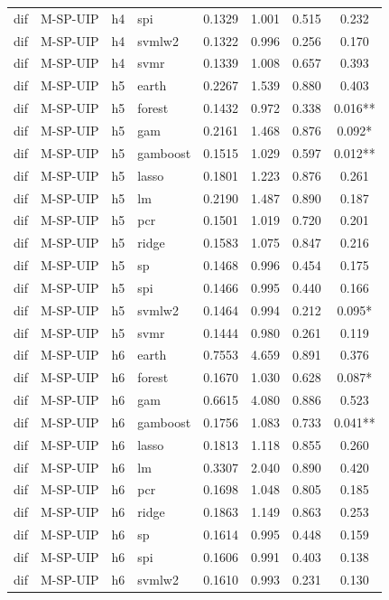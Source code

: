 \begin{ThreePartTable}
\begin{longtable}[t]{llclcccc}
dif & M-SP-UIP & h4 & spi & 0.1329 & 1.001 & 0.515 & 0.232\\
dif & M-SP-UIP & h4 & svmlw2 & 0.1322 & 0.996 & 0.256 & 0.170\\
dif & M-SP-UIP & h4 & svmr & 0.1339 & 1.008 & 0.657 & 0.393\\
\addlinespace
dif & M-SP-UIP & h5 & earth & 0.2267 & 1.539 & 0.880 & 0.403\\
dif & M-SP-UIP & h5 & forest & 0.1432 & 0.972 & 0.338 & 0.016**\\
dif & M-SP-UIP & h5 & gam & 0.2161 & 1.468 & 0.876 & 0.092*\\
dif & M-SP-UIP & h5 & gamboost & 0.1515 & 1.029 & 0.597 & 0.012**\\
dif & M-SP-UIP & h5 & lasso & 0.1801 & 1.223 & 0.876 & 0.261\\
dif & M-SP-UIP & h5 & lm & 0.2190 & 1.487 & 0.890 & 0.187\\
dif & M-SP-UIP & h5 & pcr & 0.1501 & 1.019 & 0.720 & 0.201\\
dif & M-SP-UIP & h5 & ridge & 0.1583 & 1.075 & 0.847 & 0.216\\
dif & M-SP-UIP & h5 & sp & 0.1468 & 0.996 & 0.454 & 0.175\\
dif & M-SP-UIP & h5 & spi & 0.1466 & 0.995 & 0.440 & 0.166\\
dif & M-SP-UIP & h5 & svmlw2 & 0.1464 & 0.994 & 0.212 & 0.095*\\
dif & M-SP-UIP & h5 & svmr & 0.1444 & 0.980 & 0.261 & 0.119\\
\addlinespace
dif & M-SP-UIP & h6 & earth & 0.7553 & 4.659 & 0.891 & 0.376\\
dif & M-SP-UIP & h6 & forest & 0.1670 & 1.030 & 0.628 & 0.087*\\
dif & M-SP-UIP & h6 & gam & 0.6615 & 4.080 & 0.886 & 0.523\\
dif & M-SP-UIP & h6 & gamboost & 0.1756 & 1.083 & 0.733 & 0.041**\\
dif & M-SP-UIP & h6 & lasso & 0.1813 & 1.118 & 0.855 & 0.260\\
dif & M-SP-UIP & h6 & lm & 0.3307 & 2.040 & 0.890 & 0.420\\
dif & M-SP-UIP & h6 & pcr & 0.1698 & 1.048 & 0.805 & 0.185\\
dif & M-SP-UIP & h6 & ridge & 0.1863 & 1.149 & 0.863 & 0.253\\
dif & M-SP-UIP & h6 & sp & 0.1614 & 0.995 & 0.448 & 0.159\\
dif & M-SP-UIP & h6 & spi & 0.1606 & 0.991 & 0.403 & 0.138\\
dif & M-SP-UIP & h6 & svmlw2 & 0.1610 & 0.993 & 0.231 & 0.130\\

\end{longtable}
\end{ThreePartTable}
